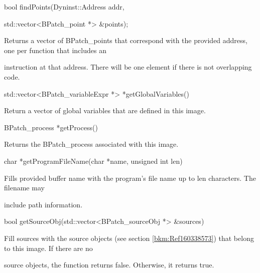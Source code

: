 {

bool findPoints(Dyninst::Address addr,



{

std::vector<BPatch_point *> &points);}



{

Returns a vector of BPatch_points that correspond with the provided address, one per function that includes an

instruction at that address. There will be one element if there is not overlapping code.}





\bigskip



{

std::vector<BPatch_variableExpr *> *getGlobalVariables()}



{

Return a vector of global variables that are defined in this image.}



{

BPatch_process *getProcess()}



{

Returns the BPatch_process associated with this image.}



{

char *getProgramFileName(char *name, unsigned int len)}



{

Fills provided buffer name with the program's file name up to len characters. The filename may

include path information.}



{

bool getSourceObj(std::vector<BPatch_sourceObj *> &sources)}



{

Fill sources with the source objects (see section \ref{bkm:Ref160338573}) that belong to this image. If there are no

source objects, the function returns false. Otherwise, it returns true.}



{

}}
